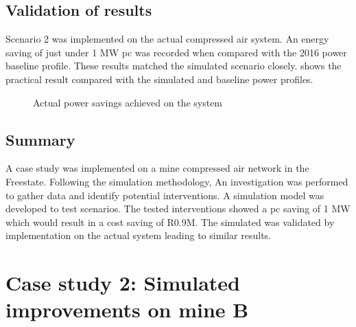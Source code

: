 \subsection{Validation of results}
Scenario 2 was implemented on the actual compressed air system. An energy saving of just under 1 MW \gls{pc} was recorded when compared with the 2016 power baseline profile. These results matched the simulated scenario closely.  shows the practical result compared with the simulated and baseline power profiles.
\begin{figure}[h!]
	\centering
	
	\caption{Actual power savings achieved on the system}
	\label{fig: Actual permormance beet}
\end{figure}
\subsection{Summary}
A case study was implemented on a mine compressed air network in the Freestate. Following the simulation methodology, An investigation was performed to gather data and identify potential interventions. A simulation model was developed to test scenarios. The tested interventions showed a \gls{pc} saving of 1 MW which would result in a cost saving of R0.9M. The simulated was validated by implementation on the actual system leading to similar results.
\section{Case study 2: Simulated improvements on mine B}

